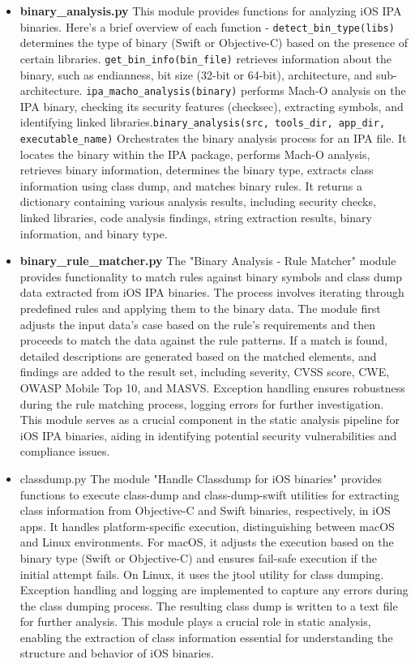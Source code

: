 \documentclass{report}
\begin{document}
\begin{itemize}
\begin{itemize}
\begin{itemize}
                    \item \textbf{binary\_analysis.py}
                    This module provides functions for analyzing iOS IPA binaries. Here's a brief overview of each function - \texttt{detect\_bin\_type(libs)} determines the type of binary (Swift or Objective-C) based on the presence of certain libraries. \texttt{get\_bin\_info(bin\_file)} retrieves information about the binary, such as endianness, bit size (32-bit or 64-bit), architecture, and sub-architecture. \texttt{ipa\_macho\_analysis(binary)} performs Mach-O analysis on the IPA binary, checking its security features (checksec), extracting symbols, and identifying linked libraries.\texttt{binary\_analysis(src, tools\_dir, app\_dir, executable\_name)} Orchestrates the binary analysis process for an IPA file. It locates the binary within the IPA package, performs Mach-O analysis, retrieves binary information, determines the binary type, extracts class information using class dump, and matches binary rules. It returns a dictionary containing various analysis results, including security checks, linked libraries, code analysis findings, string extraction results, binary information, and binary type.
                    \item \textbf{binary\_rule\_matcher.py}
                    The "Binary Analysis - Rule Matcher" module provides functionality to match rules against binary symbols and class dump data extracted from iOS IPA binaries. The process involves iterating through predefined rules and applying them to the binary data. The module first adjusts the input data's case based on the rule's requirements and then proceeds to match the data against the rule patterns. If a match is found, detailed descriptions are generated based on the matched elements, and findings are added to the result set, including severity, CVSS score, CWE, OWASP Mobile Top 10, and MASVS. Exception handling ensures robustness during the rule matching process, logging errors for further investigation. This module serves as a crucial component in the static analysis pipeline for iOS IPA binaries, aiding in identifying potential security vulnerabilities and compliance issues.
                    \item{classdump.py}
                    The module "Handle Classdump for iOS binaries" provides functions to execute class-dump and class-dump-swift utilities for extracting class information from Objective-C and Swift binaries, respectively, in iOS apps. It handles platform-specific execution, distinguishing between macOS and Linux environments. For macOS, it adjusts the execution based on the binary type (Swift or Objective-C) and ensures fail-safe execution if the initial attempt fails. On Linux, it uses the jtool utility for class dumping. Exception handling and logging are implemented to capture any errors during the class dumping process. The resulting class dump is written to a text file for further analysis. This module plays a crucial role in static analysis, enabling the extraction of class information essential for understanding the structure and behavior of iOS binaries.

\end{itemize}
\end{itemize}
\end{itemize}
\end{document}
